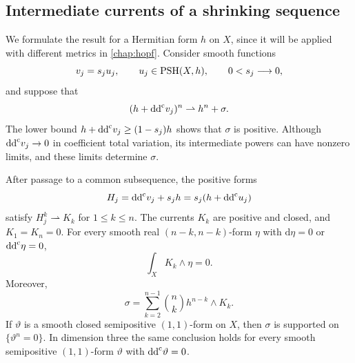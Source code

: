 \subsection{Intermediate currents of a shrinking sequence}\label{subsec:shrinking-defect-currents}

We formulate the result for a Hermitian form $h$ on $X$, since it will be applied with different metrics in \cref{chap:hopf}. Consider smooth functions
\[
 v_j=s_ju_j,\qquad u_j\in\mathrm{PSH}(X,h),\qquad 0<s_j\longrightarrow0,
\]
and suppose that
\[
 (h+\mathrm{dd}^{\mathrm{c}} v_j)^n\rightharpoonup h^n+\sigma.
\]
The lower bound $h+\mathrm{dd}^{\mathrm{c}} v_j\geq(1-s_j)h$ shows that $\sigma$ is positive. Although $\mathrm{dd}^{\mathrm{c}} v_j\to0$ in coefficient total variation, its intermediate powers can have nonzero limits, and these limits determine $\sigma$.

\begin{proposition}\label{prop:shrinking-intermediate-currents}
After passage to a common subsequence, the positive forms
\[
 H_j=\mathrm{dd}^{\mathrm{c}} v_j+s_jh=s_j(h+\mathrm{dd}^{\mathrm{c}} u_j)
\]
satisfy $H_j^k\rightharpoonup K_k$ for $1\leq k\leq n$. The currents $K_k$ are positive and closed, and $K_1=K_n=0$. For every smooth real $(n-k,n-k)$-form $\eta$ with $\mathrm{d}\eta=0$ or $\mathrm{dd}^{\mathrm{c}}\eta=0$,
\[
 \int_X K_k\wedge\eta=0.
\]
Moreover,
\begin{equation}\label{eq:shrinking-defect-current-decomposition}
 \sigma=\sum_{k=2}^{n-1}\binom nk h^{n-k}\wedge K_k.
\end{equation}
If $\vartheta$ is a smooth closed semipositive $(1,1)$-form on $X$, then $\sigma$ is supported on $\{\vartheta^n=0\}$. In dimension three the same conclusion holds for every smooth semipositive $(1,1)$-form $\vartheta$ with $\mathrm{dd}^{\mathrm{c}}\vartheta=0$.
\end{proposition}

